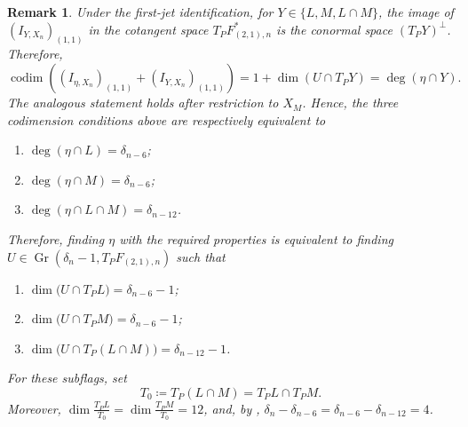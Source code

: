\documentclass[a4paper,reqno]{amsart}
\theoremstyle{plainnopunct}
\theoremstyle{definitionnopunct}
\newtheorem{remark}[remark]{Remark}
\newcommand{\codim}{\operatorname{codim}}
\DeclareMathOperator{\Gr}{Gr}
\begin{document}
\begin{remark}
Under the first-jet identification, for $Y\in\{L,M,L\cap M\}$, the image of $\left(I_{Y,X_n}\right)_{(1,1)}$ in
the cotangent space
$T_PF_{(2,1),n}^*$ is the conormal space
$\left(T_PY\right)^\perp$. Therefore,
\[
\codim
\left(
\left(I_{\eta,X_n}\right)_{(1,1)}
+
\left(I_{Y,X_n}\right)_{(1,1)}
\right)
=
1+\dim\left(U\cap T_PY\right)
=
\deg(\eta\cap Y).
\]
The analogous statement holds after restriction to $X_M$. Hence, the three codimension conditions above are respectively
equivalent to
\begin{enumerate}[leftmargin=*]
    \item
    $\deg(\eta\cap L)=\delta_{n-6}$;

    \item
    $\deg(\eta\cap M)=\delta_{n-6}$;

    \item
    $\deg(\eta\cap L\cap M)=\delta_{n-12}$.
\end{enumerate}
Therefore, finding $\eta$ with the required properties is equivalent
to finding $U
\in
\Gr
\left(
\delta_n-1, T_PF_{(2,1),n}
\right)$
such that
\begin{enumerate}[leftmargin=*]
    \item
    $
    \dim\bigl(U\cap T_PL\bigr)
    =
    \delta_{n-6}-1$;

    \item
    $
    \dim\bigl(U\cap T_PM\bigr)
    =
    \delta_{n-6}-1$;


    \item
$
    \dim\bigl(U\cap T_P(L\cap M)\bigr)
    =
    \delta_{n-12}-1$.
\end{enumerate}
For these subflags, set
\[
T_0
\coloneq
 T_P(L\cap M)
=
 T_PL\cap T_PM.
\]
Moreover,
$
\dim
\frac{ T_PL}{T_0}
=
\dim
\frac{ T_PM}{T_0}
=
12$,
and, by ,
$
\delta_n-\delta_{n-6}
=
\delta_{n-6}-\delta_{n-12}
=
4$.


\end{remark}
\end{document}
